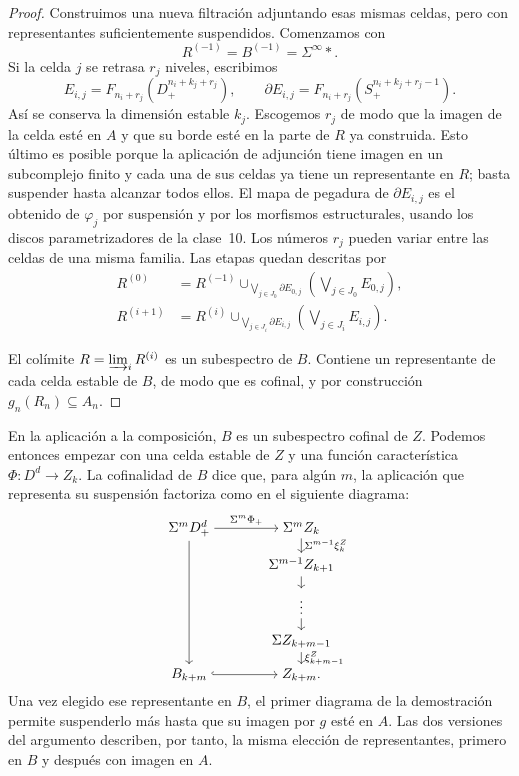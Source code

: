 \begin{proof}
Construimos una nueva filtración adjuntando esas mismas celdas, pero con representantes suficientemente suspendidos. Comenzamos con
\[
R^{(-1)}=B^{(-1)}=\Sigma^\infty *.
\]
Si la celda $j$ se retrasa $r_j$ niveles, escribimos
\[
E_{i,j}=F_{n_i+r_j}(D^{n_i+k_j+r_j}_+),\qquad
\partial E_{i,j}=F_{n_i+r_j}(S^{n_i+k_j+r_j-1}_+).
\]
Así se conserva la dimensión estable $k_j$. Escogemos $r_j$ de modo que la imagen de la celda esté en $A$ y que su borde esté en la parte de $R$ ya construida. Esto último es posible porque la aplicación de adjunción tiene imagen en un subcomplejo finito y cada una de sus celdas ya tiene un representante en $R$; basta suspender hasta alcanzar todos ellos. El mapa de pegadura de $\partial E_{i,j}$ es el obtenido de $\varphi_j$ por suspensión y por los morfismos estructurales, usando los discos parametrizadores de la clase~10. Los números $r_j$ pueden variar entre las celdas de una misma familia. Las etapas quedan descritas por
\[
\begin{aligned}
R^{(0)}&=R^{(-1)}\cup_{\bigvee_{j\in J_0}\partial E_{0,j}}
\left(\bigvee_{j\in J_0}E_{0,j}\right),\\
R^{(i+1)}&=R^{(i)}\cup_{\bigvee_{j\in J_i}\partial E_{i,j}}
\left(\bigvee_{j\in J_i}E_{i,j}\right).
\end{aligned}
\]

El colímite $R=\varinjlim\nolimits_iR^{(i)}$ es un subespectro de $B$. Contiene un representante de cada celda estable de $B$, de modo que es cofinal, y por construcción $g_n(R_n)\subseteq A_n$.
\end{proof}

En la aplicación a la composición, $B$ es un subespectro cofinal de $Z$. Podemos entonces empezar con una celda estable de $Z$ y una función característica $\Phi\colon D^d\to Z_k$. La cofinalidad de $B$ dice que, para algún $m$, la aplicación que representa su suspensión factoriza como en el siguiente diagrama:
\[
\begin{tikzcd}[cramped,column sep=large,row sep=small]
\Sigma^mD^d_+ \arrow[r,"\Sigma^m\Phi_+"] \arrow[dddd]
& \Sigma^mZ_k \arrow[d,"\Sigma^{m-1}\xi^Z_k"]\\
& \Sigma^{m-1}Z_{k+1} \arrow[d]\\
& \vdots \arrow[d]\\
& \Sigma Z_{k+m-1} \arrow[d,"\xi^Z_{k+m-1}"]\\
B_{k+m} \arrow[r,hook] & Z_{k+m}.
\end{tikzcd}
\]
Una vez elegido ese representante en $B$, el primer diagrama de la demostración permite suspenderlo más hasta que su imagen por $g$ esté en $A$. Las dos versiones del argumento describen, por tanto, la misma elección de representantes, primero en $B$ y después con imagen en $A$.

